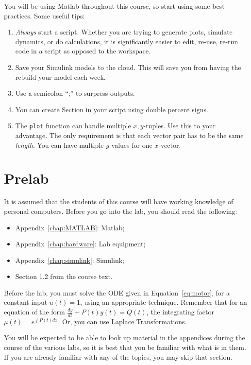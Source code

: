 You will be using Matlab throughout this course, so start using some best practices. Some useful tips:
\begin{enumerate}
    \item \emph{Always} start a script. Whether you are trying to generate plots, simulate dynamics, or do calculations, it is significantly easier to edit, re-use, re-run code in a script as opposed to the workspace.
    \item Save your Simulink models to the cloud. This will save you from having the rebuild your model each week.
    \item Use a semicolon ``;'' to surpress outputs.
    \item You can create Section in your script using double percent signs.
    \item The \verb|plot| function can handle multiple \(x,y\)-tuples. Use this to your advantage. The only requirement is that each vector pair has to be the same \emph{length}. You can have multiple \(y\) values for one \(x\) vector.
\end{enumerate}
\section{Prelab}

It is assumed that the students of this course will have working knowledge of
personal computers. Before you go into the lab, you should read the
following:
\begin{itemize}
    \item Appendix~\ref{chap:MATLAB}: \textsf{Matlab};
    \item Appendix~\ref{chap:hardware}: Lab equipment;
    \item Appendix~\ref{chap:simulink}: \textsf{Simulink};
    \item Section 1.2 from the course text.
\end{itemize}

Before the lab, you must solve the ODE given in Equation~\ref{eq:motor}, for a constant input \(u(t)=1\), using an appropriate technique.
Remember that for an equation of the form \(\frac{dy}{dt} + P(t)y(t) = Q(t)\), the integrating factor \(\mu(t) = e^{\int P(t)dx}\). Or, you can use Laplace Transformations.

You will be expected to be able to look up material in the appendices during
the course of the various labs, so it is best that you be familiar with what
is in them.  If you are already familiar with any of the topics, you may skip
that section.

